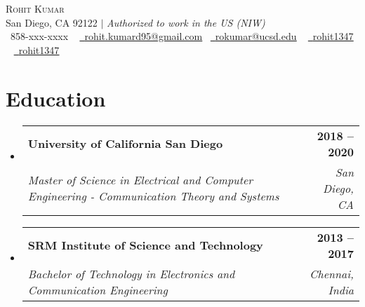 \documentclass[letterpaper,11pt]{article}
\makeatletter
\newcommand{\resumeSubheading}[4]{
  \vspace{-2pt}\item
    \begin{tabular*}{1.0\textwidth}[t]{l@{\extracolsep{\fill}}r}
      \textbf{#1} & \textbf{\small #2} \\
      \textit{\small#3} & \textit{\small #4} \\
    \end{tabular*}\vspace{-7pt}
}
\newcommand{\resumeSubHeadingListStart}{\begin{itemize}[leftmargin=0.0in, label={}]}
\newcommand{\resumeSubHeadingListEnd}{\end{itemize}}
\makeatother
\begin{document}

\begin{center}
    {\Huge \scshape Rohit Kumar} \\ \vspace{1pt}
    San Diego, CA 92122  $|$ \emph{Authorized to work in the US (NIW)} \\ \vspace{1pt}
    \small \raisebox{-0.1\height}\faPhone\ 858-xxx-xxxx ~ \href{mailto:rohit.kumard95@gmail.com}{\raisebox{-0.2\height}\faEnvelope\  \underline{rohit.kumard95@gmail.com}} ~\href{mailto:rokumar@ucsd.edu}{\raisebox{-0.2\height}\faEnvelope\  \underline{rokumar@ucsd.edu}} ~ 
    \href{https://www.linkedin.com/in/rohit1347/}{\raisebox{-0.2\height}\faLinkedin\ \underline{rohit1347}}  ~
    \href{https://github.com/rohit1347}{\raisebox{-0.2\height}\faGithub\ \underline{rohit1347}}
    \vspace{-8pt}
\end{center}


\section{Education}
  \resumeSubHeadingListStart
    \resumeSubheading
      {University of California San Diego}{2018 -- 2020}
      {Master of Science in Electrical and Computer Engineering - Communication Theory and Systems}{San Diego, CA}
       \resumeSubheading
      {SRM Institute of Science and Technology}{2013 -- 2017}
      {Bachelor of Technology in Electronics and Communication Engineering}{Chennai, India}
  \resumeSubHeadingListEnd

\end{document}
